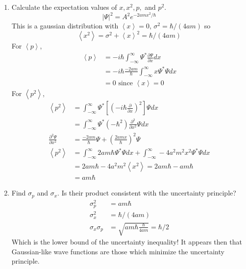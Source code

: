 \documentclass{article}
\newcommand{\ddx}[1]{\frac{\partial #1}{\partial x}}
\newcommand{\dddx}[1]{\frac{\partial^2 #1}{\partial x^2}}
\newcommand{\bracket}[1]{\left[ #1 \right]}
\newcommand{\paren}[1]{\left( #1 \right)}
\newcommand{\braket}[1]{\left\langle #1 \right\rangle}
\newcommand{\intinf}{\int_{-\infty}^\infty}
\begin{document}
\begin{enumerate}[label=(\alph*)]
  \item Calculate the expectation values of \(x, x^2, p,\) and \(p^2\).
    \[|\Psi|^2 = A^2e^{-2amx^2/\hbar}\]
    This is a gaussian distribution with $\braket{x} = 0$, $\sigma^2 = \hbar / (4am)$ so 
    \[\braket{x^2} = \sigma^2 + \braket{x}^2 = \hbar / (4am)\]
    For \(\braket{p}\), 
    \begin{align*}
      \braket{p} &= -i \hbar \intinf \Psi^*\ddx{\Psi} dx \\
                 &= -i \hbar \frac{-2am}{\hbar} \intinf x \Psi^* \Psi dx \\
                 &= 0 \text{ since } \braket{x} = 0
    \end{align*}
    For \(\braket{p^2}\),
    \begin{align*}
      \braket{p^2} &= \intinf \Psi^* \bracket{\paren{-i\hbar\ddx{}}^2} \Psi dx \\
                   &= \intinf \Psi^* (-\hbar^2) \dddx{} \Psi dx \\
       \dddx{\Psi} &= \frac{-2am}{\hbar}\Psi + \paren{\frac{2amx}{\hbar}}^2 \Psi \\
       \braket{p^2} &= \intinf 2am\hbar \Psi^* \Psi dx + \intinf -4a^2m^2x^2 \Psi^* \Psi dx \\
                    &= 2am\hbar - 4a^2m^2 \braket{x^2} = 2am\hbar - am\hbar \\
                    &= am\hbar
    \end{align*}
  \item Find $\sigma_p$ and $\sigma_x$. Is their product consistent with the uncertainty principle?
    \begin{align*}
      \sigma_p^2 &= am\hbar \\
      \sigma_x^2 &= \hbar/(4am) \\
      \sigma_x \sigma_p &= \sqrt{am\hbar \frac{\hbar}{4am}} = \hbar / 2
    \end{align*}
    Which is the lower bound of the uncertainty inequality! It appears then that Gaussian-like wave functions are those which minimize the uncertainty principle.
\end{enumerate}
\end{document}
